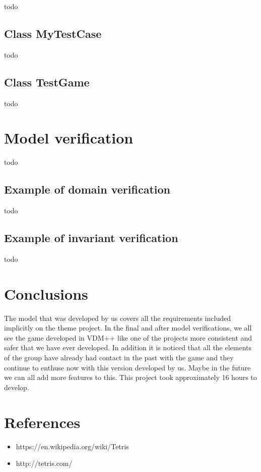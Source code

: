 \documentclass[a4paper]{article}
\begin{document}
todo

\subsection{Class MyTestCase} 

todo

\subsection{Class TestGame} 

todo

\section{Model verification}

todo

\subsection{Example of domain verification} 

todo

\subsection{Example of invariant verification} 

todo

\section{Conclusions} 

The model that was developed by us covers all the requirements included implicitly on the theme project.
In the final and after model verifications, we all see the game developed in VDM++ like one of the projects more consistent and safer that we have ever developed. 
In addition it is noticed that all the elements of the group have already had contact in the past with the game and they continue to enthuse now with this version developed by us. Maybe in the future we can all add more features to this.
This project took approximately 16 hours to develop.


\section{References}

\begin{itemize}
\item https://en.wikipedia.org/wiki/Tetris
\item http://tetris.com/
\end{itemize}
\end{document}
